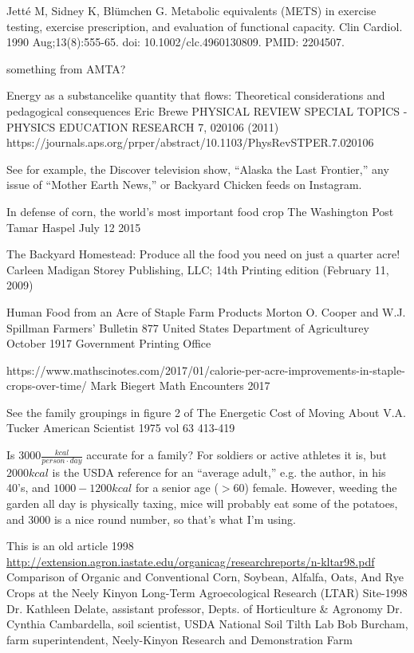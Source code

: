 \documentclass[12pt]{iopart}
\begin{document}
\begin{thebibliography}{99}
Jetté M, Sidney K, Blümchen G. Metabolic equivalents (METS) in exercise testing, exercise prescription, and evaluation of functional capacity. Clin Cardiol. 1990 Aug;13(8):555-65. doi: 10.1002/clc.4960130809. PMID: 2204507.

something from AMTA?

Energy as a substancelike quantity that flows: Theoretical considerations
and pedagogical consequences
Eric Brewe
PHYSICAL REVIEW SPECIAL TOPICS - PHYSICS EDUCATION RESEARCH 7, 020106 (2011)
https://journals.aps.org/prper/abstract/10.1103/PhysRevSTPER.7.020106

See for example, the Discover television show, ``Alaska the Last Frontier,'' any issue of ``Mother Earth News,'' or Backyard Chicken feeds on Instagram.  
 
 
In defense of corn, the world’s most important food crop
The Washington Post
Tamar Haspel 
July 12 2015

The Backyard Homestead: Produce all the food you need on just a quarter acre!
Carleen Madigan
Storey Publishing, LLC; 14th Printing edition (February 11, 2009)



Human Food from an Acre of Staple Farm Products
Morton O. Cooper and W.J. Spillman
Farmers' Bulletin 877
United States Department of Agriculturey
October 1917
Government Printing Office


https://www.mathscinotes.com/2017/01/calorie-per-acre-improvements-in-staple-crops-over-time/
Mark Biegert 
Math Encounters 
2017

See the family groupings in figure 2 of 
The Energetic Cost of Moving About
V.A. Tucker
American Scientist
1975
vol 63
413-419

 Is $3000\frac{kcal}{person\cdot day}$ accurate for a family?  For soldiers or active athletes it is, but $2000kcal$ is the USDA reference for an ``average adult,'' e.g. the author, in his 40's, and   $1000-1200kcal$ for a senior age ($>60$) female.  However, weeding the garden all day is physically taxing, mice will probably eat some of the potatoes, and $3000$ is a nice round number, so that's what I'm using.

This is an old article 
1998
\url{http://extension.agron.iastate.edu/organicag/researchreports/n-kltar98.pdf}
Comparison of Organic and Conventional Corn, 
Soybean, Alfalfa, Oats, And Rye Crops at the Neely Kinyon Long-Term Agroecological Research (LTAR) 
Site-1998 
Dr. Kathleen Delate, assistant professor, Depts. of Horticulture \& Agronomy 
Dr. Cynthia Cambardella, soil scientist, USDA National Soil Tilth Lab 
Bob Burcham, farm superintendent, Neely-Kinyon Research and Demonstration Farm


\end{thebibliography}
\end{document}
